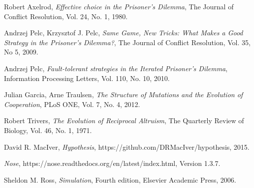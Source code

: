 \documentclass[a4paper,12pt]{article}
\begin{document}
\begin{thebibliography}{9}

        Robert Axelrod,
        \emph{Effective choice in the Prisoner's Dilemma},
        The Journal of Conflict Resolution,
        Vol. 24,
        No. 1,
        1980.

        Andrzej Pelc, Krzysztof J. Pelc,
        \emph{Same Game, New Tricks: What Makes a Good Strategy in the Prisoner's Dilemma?},
        The Journal of Conflict Resolution,
        Vol. 35,
        No 5,
        2009.

        Andrzej Pelc,
        \emph{Fault-tolerant strategies in the Iterated Prisoner's Dilemma},
        Information Processing Letters,
        Vol. 110,
        No. 10,
        2010.

        Julian Garcia, Arne Traulsen,
        \emph{The Structure of Mutations and the Evolution of Cooperation},
        PLoS ONE,
        Vol. 7,
        No. 4,
        2012.

        Robert Trivers,
        \emph{The Evolution of Reciprocal Altruism},
        The Quarterly Review of Biology,
        Vol. 46,
        No. 1,
        1971.

        David R. MacIver,
        \emph{Hypothesis},
        https://github.com/DRMacIver/hypothesis,
        2015.

        \emph{Nose},
        https://nose.readthedocs.org/en/latest/index.html,
        Version 1.3.7.


        Sheldon M. Ross,
        \emph{Simulation},
        Fourth edition,
        Elsevier Academic Press,
        2006.

\end{thebibliography}
\end{document}
